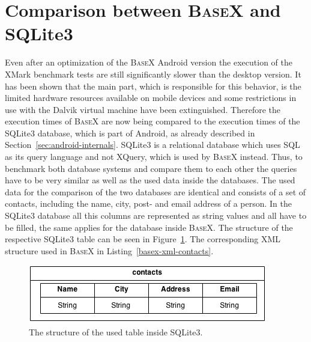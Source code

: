\section{Comparison between \textsc{BaseX} and SQLite3}
\label{sec:comparison-between-basex-and-sqlite}
Even after an optimization of the \textsc{BaseX} Android version the execution of the XMark benchmark tests are still significantly slower than the desktop version.
It has been shown that the main part, which is responsible for this behavior, is the limited hardware resources available on mobile devices and some restrictions in use with the Dalvik virtual machine have been extinguished.
Therefore the execution times of \textsc{BaseX} are now being compared to the execution times of the SQLite3 database, which is part of Android, as already described in Section~\ref{sec:android-internals}.
SQLite3 is a relational database which uses SQL as its query language and not XQuery, which is used by \textsc{BaseX} instead.
Thus, to benchmark both database systems and compare them to each other the queries have to be very similar as well as the used data inside the databases.
The used data for the comparison of the two databases are identical and consists of a set of contacts, including the name, city, post- and email address of a person.
In the SQLite3 database all this columns are represented as string values and all have to be filled, the same applies for the database inside \textsc{BaseX}.
The structure of the respective SQLite3 table can be seen in Figure~\ref{fig:sqlite-tables-contacts}.
The corresponding XML structure used in \textsc{BaseX} in Listing~\ref{basex-xml-contacts}.

\begin{figure}[h]
\begin{center}
\includegraphics[scale=0.65]{images/sqlite-tables.png} 
\caption{The structure of the used table inside SQLite3.}
\label{fig:sqlite-tables-contacts}
\end{center}
\end{figure}




